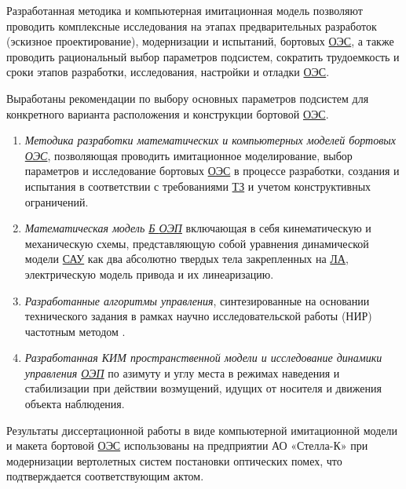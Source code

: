 {\influence} 

Разработанная методика и компьютерная имитационная модель позволяют проводить комплексные исследования на этапах предварительных разработок (эскизное проектирование), модернизации и испытаний, бортовых  \hyperref[acroEOS]{ОЭС}, а также проводить рациональный выбор параметров подсистем, сократить трудоемкость и сроки этапов разработки, исследования, настройки и отладки  \hyperref[acroEOS]{ОЭС}.

Выработаны рекомендации по выбору основных параметров подсистем для конкретного варианта расположения и конструкции бортовой  \hyperref[acroEOS]{ОЭС}.

\begin{comment}
{\methods} \todo{методы исследования}\ldots
\end{comment}

{}
\begin{enumerate}
  \item \textit{Методика разработки математических и компьютерных моделей бортовых  \hyperref[acroEOS]{ОЭС}}, позволяющая проводить имитационное моделирование, выбор параметров и исследование бортовых  \hyperref[acroEOS]{ОЭС} в процессе разработки, создания и испытания в соответствии с требованиями  \hyperref[acroTZ]{ТЗ} и учетом конструктивных ограничений. 
  \item \textit{Математическая модель  \hyperref[acroAEOS]{Б \hyperref[acroEOS]{ОЭП}}} включающая в себя кинематическую и механическую схемы, представляющую собой уравнения динамической модели  \hyperref[acroSAU]{САУ} как два абсолютно твердых тела закрепленных на  \hyperref[acroLA]{ЛА}, электрическую модель привода и их линеаризацию.
  \item \textit{Разработанные алгоритмы управления}, синтезированные на основании технического задания в рамках научно исследовательской работы (НИР) частотным методом \cite[]{Babaev}.
  \item \textit{Разработанная КИМ пространственной модели и исследование динамики управления  \hyperref[acroEOS]{ОЭП}} по азимуту и углу места в режимах наведения и стабилизации при действии возмущений, идущих от носителя и движения объекта наблюдения.
\end{enumerate}
\begin{comment}
{\reliability} \todo{полученных результатов обеспечивается Результаты находятся в соответствии с результатами, полученными другими авторами.}
\end{comment}

{\probation}
Результаты диссертационной работы в виде компьютерной имитационной модели и макета бортовой  \hyperref[acroEOS]{ОЭС} использованы на предприятии АО «Стелла-К» при модернизации вертолетных систем постановки оптических помех, что подтверждается соответствующим актом.

